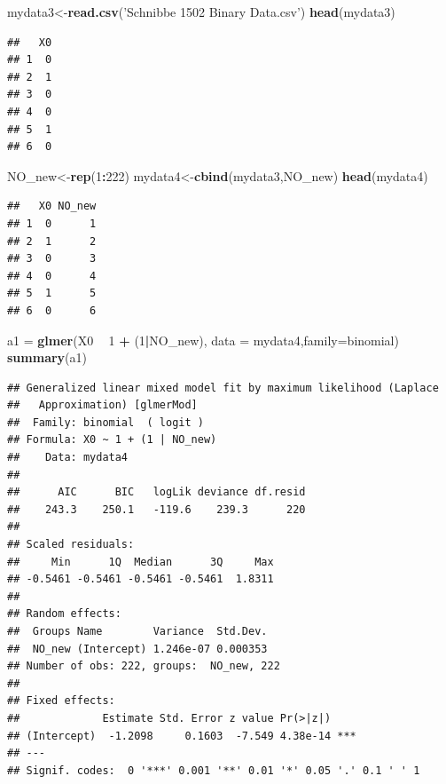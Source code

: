 \documentclass[]{book}
\newenvironment{Shaded}{\begin{snugshade}}{\end{snugshade}}
\newcommand{\DataTypeTok}[1]{\textcolor[rgb]{0.13,0.29,0.53}{#1}}
\newcommand{\DecValTok}[1]{\textcolor[rgb]{0.00,0.00,0.81}{#1}}
\newcommand{\KeywordTok}[1]{\textcolor[rgb]{0.13,0.29,0.53}{\textbf{#1}}}
\newcommand{\NormalTok}[1]{#1}
\newcommand{\OperatorTok}[1]{\textcolor[rgb]{0.81,0.36,0.00}{\textbf{#1}}}
\newcommand{\StringTok}[1]{\textcolor[rgb]{0.31,0.60,0.02}{#1}}
\begin{document}
\begin{Shaded}
\begin{Highlighting}[]
\NormalTok{mydata3<-}\KeywordTok{read.csv}\NormalTok{(}\StringTok{'Schnibbe 1502 Binary Data.csv'}\NormalTok{)}
\KeywordTok{head}\NormalTok{(mydata3)}
\end{Highlighting}
\end{Shaded}

\begin{verbatim}
##   X0
## 1  0
## 2  1
## 3  0
## 4  0
## 5  1
## 6  0
\end{verbatim}

\begin{Shaded}
\begin{Highlighting}[]
\NormalTok{NO_new<-}\KeywordTok{rep}\NormalTok{(}\DecValTok{1}\OperatorTok{:}\DecValTok{222}\NormalTok{)}
\NormalTok{mydata4<-}\KeywordTok{cbind}\NormalTok{(mydata3,NO_new)}
\KeywordTok{head}\NormalTok{(mydata4)}
\end{Highlighting}
\end{Shaded}

\begin{verbatim}
##   X0 NO_new
## 1  0      1
## 2  1      2
## 3  0      3
## 4  0      4
## 5  1      5
## 6  0      6
\end{verbatim}

\begin{Shaded}
\begin{Highlighting}[]
\NormalTok{a1 =}\StringTok{ }\KeywordTok{glmer}\NormalTok{(X0 }\OperatorTok{~}\StringTok{ }\DecValTok{1} \OperatorTok{+}\StringTok{ }\NormalTok{(}\DecValTok{1}\OperatorTok{|}\NormalTok{NO_new), }\DataTypeTok{data =}\NormalTok{ mydata4,}\DataTypeTok{family=}\NormalTok{binomial)}
\KeywordTok{summary}\NormalTok{(a1)}
\end{Highlighting}
\end{Shaded}

\begin{verbatim}
## Generalized linear mixed model fit by maximum likelihood (Laplace
##   Approximation) [glmerMod]
##  Family: binomial  ( logit )
## Formula: X0 ~ 1 + (1 | NO_new)
##    Data: mydata4
## 
##      AIC      BIC   logLik deviance df.resid 
##    243.3    250.1   -119.6    239.3      220 
## 
## Scaled residuals: 
##     Min      1Q  Median      3Q     Max 
## -0.5461 -0.5461 -0.5461 -0.5461  1.8311 
## 
## Random effects:
##  Groups Name        Variance  Std.Dev.
##  NO_new (Intercept) 1.246e-07 0.000353
## Number of obs: 222, groups:  NO_new, 222
## 
## Fixed effects:
##             Estimate Std. Error z value Pr(>|z|)    
## (Intercept)  -1.2098     0.1603  -7.549 4.38e-14 ***
## ---
## Signif. codes:  0 '***' 0.001 '**' 0.01 '*' 0.05 '.' 0.1 ' ' 1
\end{verbatim}
\end{document}
